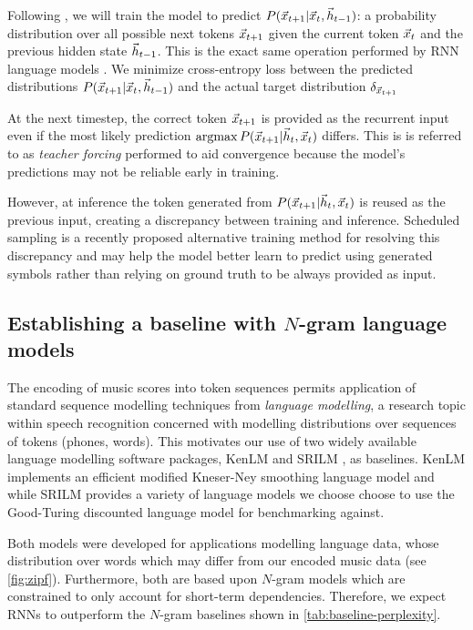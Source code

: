 Following \citep{mozer1994neural}, we will train the model to predict
$P(\vec{x}_{t+1} | \vec{x}_t, \vec{h}_{t-1})$: a probability distribution over all possible
next tokens $\vec{x}_{t+1}$ given the current token $\vec{x}_{t}$ and the previous hidden
state $\vec{h}_{t-1}$. This is the exact same operation performed by RNN language
models \citep{Mikolov2010}. We minimize cross-entropy loss between the
predicted distributions $P(\vec{x}_{t+1} | \vec{x}_t, \vec{h}_{t-1})$ and the actual target
distribution $\delta_{\vec{x}_{t+1}}$

At the next timestep, the correct token $\vec{x}_{t+1}$ is provided as the recurrent
input even if the most likely prediction $\operatorname*{argmax} P(\vec{x}_{t+1} | \vec{h}_t, \vec{x}_t)$
differs. This is is referred to as \emph{teacher forcing}
\citep{williams1989learning} performed to aid convergence because the model's
predictions may not be reliable early in training.

However, at inference the token generated from $P(\vec{x}_{t+1} | \vec{h}_t, \vec{x}_t)$ is
reused as the previous input, creating a discrepancy between training and
inference. Scheduled sampling \citep{bengio2015scheduled} is a recently
proposed alternative training method for resolving this discrepancy and may
help the model better learn to predict using generated symbols rather than
relying on ground truth to be always provided as input.

\subsection{Establishing a baseline with $N$-gram language models}\label{sec:ngram-baselines}

The encoding of music scores into token sequences permits application of
standard sequence modelling techniques from \emph{language modelling}, a
research topic within speech recognition concerned with modelling distributions
over sequences of tokens (\eg phones, words). This motivates our use of two
widely available language modelling software packages, KenLM
\citep{Heafield-estimate} and SRILM \citep{stolcke2002srilm}, as baselines.
KenLM implements an efficient modified Kneser-Ney smoothing language model and
while SRILM provides a variety of language models we choose choose to use the
Good-Turing discounted language model for benchmarking against.

Both models were developed for applications modelling language data, whose distribution
over words which may differ from our encoded music data (see \vref{fig:zipf}).
Furthermore, both are based upon $N$-gram models which are constrained to only
account for short-term dependencies. Therefore, we expect RNNs to outperform the
$N$-gram baselines shown in \vref{tab:baseline-perplexity}.

